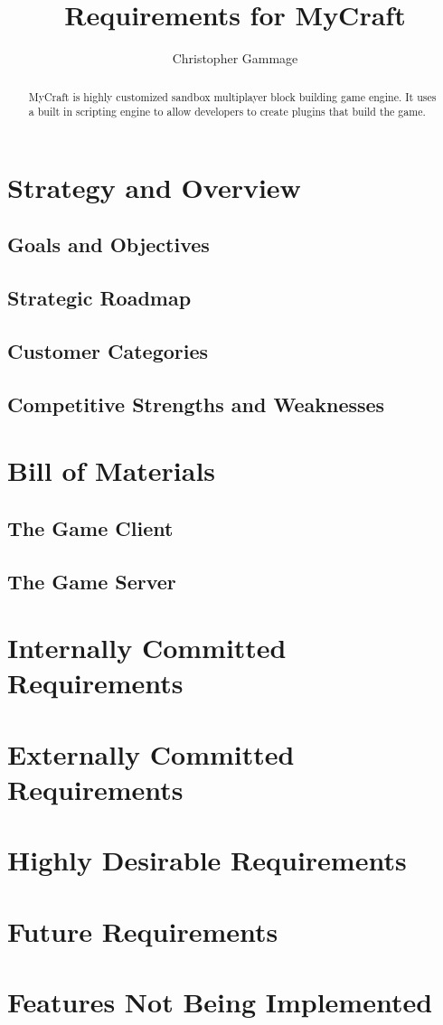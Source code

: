 \documentclass{article}
\begin{document}
\title{Requirements for MyCraft}
\author{Christopher Gammage}
\maketitle

\begin{abstract}
MyCraft is highly customized sandbox multiplayer block building game engine.  It uses a built in scripting engine to allow developers to create plugins that build the game.  
\end{abstract}

\tableofcontents

\section{Strategy and Overview}
\subsection{Goals and Objectives}
\subsection{Strategic Roadmap}
\subsection{Customer Categories}
\subsection{Competitive Strengths and Weaknesses}

\section{Bill of Materials}
\subsection{The Game Client}
\subsection{The Game Server}

\section{Internally Committed Requirements}

\section{Externally Committed Requirements}

\section{Highly Desirable Requirements}

\section{Future Requirements}

\section{Features Not Being Implemented}
\end{document}
